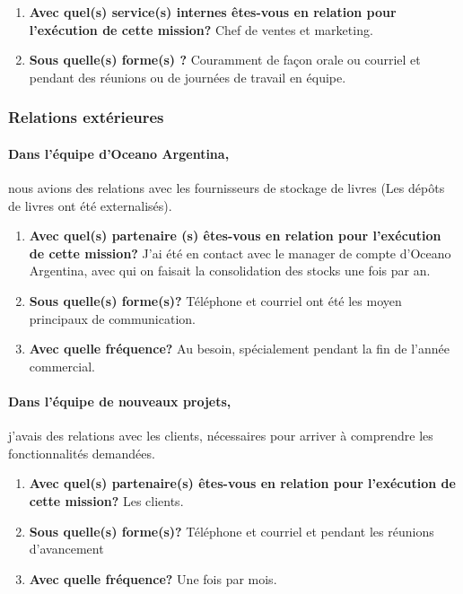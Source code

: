 \documentclass{resume} %
\begin{document}
		\begin{enumerate}
		\item \textbf{Avec quel(s) service(s) internes êtes-vous en relation pour l'exécution de cette mission?}
			Chef de ventes et marketing. 
		\item \textbf{Sous quelle(s) forme(s) ?}
			Couramment de façon orale ou courriel et pendant des réunions ou de journées de travail en équipe.
		\end{enumerate}

	
	\subsubsection{Relations extérieures} 
		\paragraph{Dans l'équipe d'Oceano Argentina,} nous avions des relations avec les fournisseurs de stockage de livres (Les dépôts de livres ont été externalisés).
		\begin{enumerate}
		\item \textbf{Avec quel(s) partenaire (s) êtes-vous en relation pour l'exécution de cette mission?}
			J'ai été en contact avec le manager de compte d'Oceano Argentina, avec qui on faisait la consolidation des stocks une fois par an.
		\item \textbf{Sous quelle(s) forme(s)?}
			Téléphone et courriel ont été les moyen principaux de communication. 
		\item \textbf{Avec quelle fréquence?}
			Au besoin, spécialement pendant la fin de l'année commercial.
		\end {enumerate}			
		
		\paragraph{Dans l'équipe de nouveaux projets,} j'avais des relations avec les clients, nécessaires pour arriver \`a comprendre les fonctionnalités demandées.   
		\begin{enumerate}
		\item \textbf{Avec quel(s) partenaire(s) êtes-vous en relation pour l'exécution de cette mission?}
			Les clients.
		\item \textbf{ Sous quelle(s) forme(s)?}
			Téléphone et courriel et pendant les réunions d'avancement 
		\item \textbf{Avec quelle fréquence?}
			Une fois par mois.
		\end {enumerate}			
		
\end{document}
